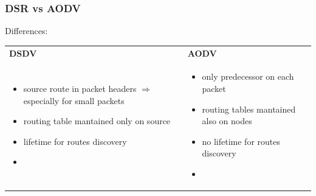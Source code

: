 \subsubsection{DSR vs AODV}
Differences:
\vspace*{0.2cm}
\begin{center}
    \begin{tabular}{|p{5.5cm}|p{5.5cm}|}
        \hline
        \centering \textbf{DSDV} & \centering \textbf{AODV} \arraybackslash\\
        \begin{minipage}{1 \textwidth}
            \vspace*{0.1cm}
            \begin{itemize}
                \addtolength{\itemindent}{-0.5cm}
                \item source route in packet headers \newline\hspace*{-0.5cm}$\Rightarrow$ especially for small packets 
                \vspace*{0.15cm}
                \item routing table mantained only \newline\hspace*{-0.5cm}on source
                \vspace*{0.15cm}
                \item lifetime for routes discovery
                \item[]
            \end{itemize}
        \end{minipage}
        &
        \begin{minipage}{1 \textwidth}
            \vspace*{0.1cm}
            \begin{itemize}
                \addtolength{\itemindent}{-0.5cm}
                \item only predecessor on each \newline\hspace*{-0.5cm}packet
                \vspace*{0.15cm}
                \item routing tables mantained also \newline\hspace*{-0.5cm}on nodes
                \vspace*{0.15cm}
                \item no lifetime for routes discovery
                \item[]
            \end{itemize}
        \end{minipage}
        \\
        \hline
    \end{tabular}
\end{center}

